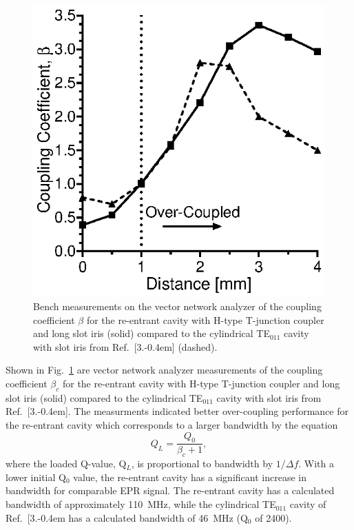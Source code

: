 \begin{figure}[htb]\centering
 \includegraphics{Kapitel/Ch2-Images/08-couplingcoeff.eps}
 \caption[Bench measurements of the coupling coefficient.]{Bench measurements on the vector network analyzer of the coupling coefficient $\beta$  for the re-entrant \cylTE{} cavity with H-type T-junction coupler and long slot iris (solid) compared to the cylindrical TE$_{011}$ cavity with slot iris from Ref.~[3.\kern-0.4em] (dashed).}
 \label{Ch2-fig:coupling}
\end{figure}

Shown in Fig.~\ref{Ch2-fig:coupling} are vector network analyzer measurements of the coupling coefficient $\beta_c$ for the re-entrant \cylTE{} cavity with H-type T-junction coupler and long slot iris (solid) compared to the cylindrical TE$_{011}$ cavity with slot iris from Ref.~[3.\kern-0.4em]. The measurments indicated better over-coupling performance for the re-entrant \cylTE{} cavity which corresponds to a larger bandwidth by the equation
\begin{equation}
    Q_L = \frac{Q_0}{\beta_c+1}, \label{q0eqn}
\end{equation}
where the loaded Q-value, Q$_L$, is proportional to bandwidth by $1/\Delta f$. \cite{ramo1984fields} With a lower initial Q$_0$ value, the re-entrant \cylTE{} cavity has a significant increase in bandwidth for comparable EPR signal. The re-entrant \cylTE{} cavity has a calculated bandwidth of approximately 110~MHz, while the cylindrical TE$_{011}$ cavity of Ref.~[3.\kern-0.4em has a calculated bandwidth of 46~MHz (Q$_0$ of 2400).

